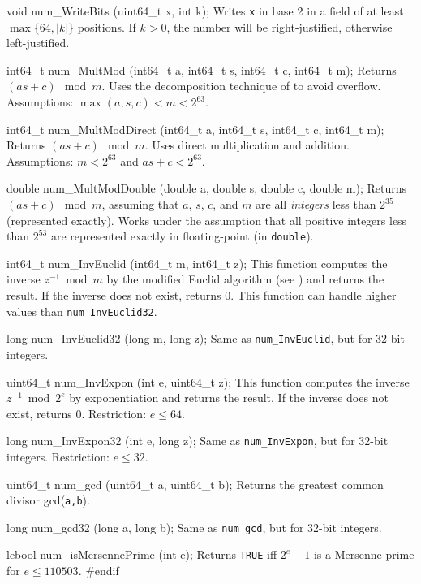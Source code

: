 void num_WriteBits (uint64_t x, int k);
\endcode
 \tab Writes {\tt x} in base 2 in a field of at least $\max\{64, |k|\}$ positions.
  If $k>0$, the number will be right-justified, otherwise left-justified.
 \endtab
\code

int64_t num_MultMod (int64_t a, int64_t s, int64_t c, int64_t m);
\endcode
\tab  Returns $(as + c) \mod m$.  Uses the decomposition technique
  of \cite{rLEC91a} to avoid overflow.
	Assumptions: $\max(a,s,c) < m < 2^{63}$.
\endtab
\code

int64_t num_MultModDirect (int64_t a, int64_t s, int64_t c, int64_t m);
\endcode
\tab  Returns $(as + c) \mod m$.  Uses direct multiplication and addition.
  Assumptions: $m < 2^{63}$ and $as+c < 2^{63}$.
\endtab
\code

double num_MultModDouble (double a, double s, double c, double m);
\endcode
 \tab  Returns $(as+c) \mod m$, assuming that
  $a$, $s$, $c$, and $m$ are all {\em integers\/} less than $2^{35}$
  (represented exactly).
  Works under the assumption that all positive integers less than
  $2^{53}$ are represented exactly in floating-point (in {\tt double}).
\endtab
\code

int64_t num_InvEuclid (int64_t m, int64_t z);
\endcode
 \tab  This function computes the inverse $z^{-1}\bmod m$ by the
  modified Euclid algorithm (see \cite[p. 325]{iKNU81a}) and returns
  the result. If the inverse does not exist, returns 0. This function
  can handle higher values than {\tt num\_InvEuclid32}.
\endtab
\code

long num_InvEuclid32 (long m, long z);
\endcode
 \tab  Same as \texttt{num\_InvEuclid}, but for 32-bit integers.
\endtab
\code

uint64_t num_InvExpon (int e, uint64_t z);
\endcode
 \tab
  This function computes the inverse  $z^{-1} \bmod 2^e$
  by exponentiation  and returns the result. If the inverse does not  exist, returns 0.
  Restriction: $e \le 64$.
 \endtab
\code

long num_InvExpon32 (int e, long z);
 \endcode
 \tab  Same as \texttt{num\_InvExpon}, but for 32-bit integers.
  Restriction: $e \le 32$.
\endtab
\code

uint64_t num_gcd (uint64_t a, uint64_t b);
 \endcode
 \tab  Returns the greatest common divisor gcd(\texttt{a,b}).
\endtab
\code

long num_gcd32 (long a, long b);
 \endcode
 \tab  Same as \texttt{num\_gcd}, but for 32-bit integers.
\endtab
\code

lebool num_isMersennePrime (int e);
 \endcode
 \tab  Returns \texttt{TRUE} iff $2^e-1$ is a Mersenne prime for $e \le 110503$.
\endtab
\code\hide
#endif
\endhide\endcode
